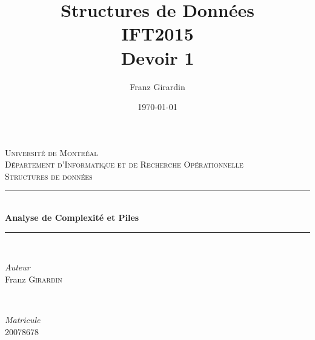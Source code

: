 \documentclass[10pt]{report}
\title{\Huge{Structures de Données}\\{IFT2015}\\{\textbf{Devoir 1}}}
\author{\huge{Franz Girardin}}
\date{\today}
\begin{document}
\begin{titlepage} %
	\newcommand{\HRule}{\rule{\linewidth}{0.5mm}} %
	
	\center %
	
	
	\textsc{\LARGE Université de Montréal}\\[1.5cm] %
	
	\textsc{\Large Département d'Informatique et de Recherche Opérationnelle}\\[0.5cm] %
	
	\textsc{\large Structures de données}\\[0.5cm] %
	
	
	\HRule\\[0.4cm]
	
	{\huge\bfseries Analyse de Complexité et Piles}\\[0.4cm] %
	
	\HRule\\[1.5cm]
	
	
	\begin{minipage}{0.4\textwidth}
		\begin{flushleft}
			\large
			\textit{Auteur}\\
		Franz \textsc{Girardin} %
		\end{flushleft}
	\end{minipage}
	~
	\begin{minipage}{0.4\textwidth}
		\begin{flushright}
			\large
			\textit{Matricule}\\
			\textsc{20078678} %
		\end{flushright}
	\end{minipage}
	
	

\end{titlepage}
\end{document}
